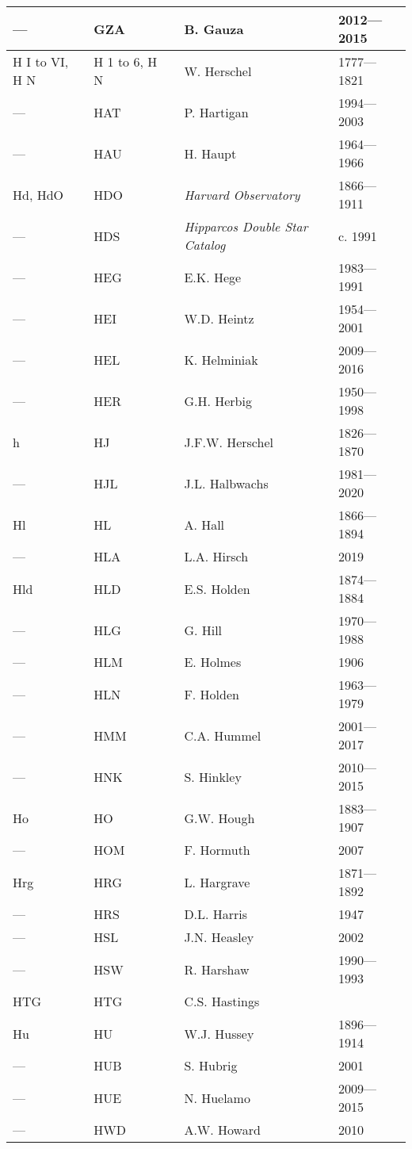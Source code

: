 \begin{longtable}{l|l|c|p{59mm}|l}
--- & GZA &   & B. Gauza & 2012---2015 \\\midrule
H I to VI, H N & H 1 to 6, H N &   & W. Herschel & 1777---1821 \\
--- & HAT &   & P. Hartigan & 1994---2003 \\
--- & HAU &   & H. Haupt & 1964---1966 \\
Hd, HdO & HDO &   & \emph{Harvard Observatory} & 1866---1911 \\
--- & HDS &   & \emph{Hipparcos Double Star Catalog} & c. 1991 \\
--- & HEG &   & E.K. Hege & 1983---1991 \\
--- & HEI &   & W.D. Heintz & 1954---2001 \\
--- & HEL &   & K. Helminiak & 2009---2016 \\
--- & HER &   & G.H. Herbig & 1950---1998 \\
h    & HJ  &   & J.F.W. Herschel & 1826---1870 \\
--- & HJL &   & J.L. Halbwachs & 1981---2020 \\
Hl  & HL  &   & A. Hall & 1866---1894 \\
--- & HLA &   & L.A. Hirsch & 2019 \\
Hld & HLD &   & E.S. Holden & 1874---1884 \\
--- & HLG &   & G. Hill & 1970---1988 \\
--- & HLM &   & E. Holmes & 1906 \\
--- & HLN &   & F. Holden & 1963---1979 \\
--- & HMM &   & C.A. Hummel & 2001---2017 \\
--- & HNK &   & S. Hinkley & 2010---2015 \\
Ho  & HO  &   & G.W. Hough & 1883---1907 \\
--- & HOM &   & F. Hormuth & 2007 \\
Hrg & HRG &   & L. Hargrave & 1871---1892 \\
--- & HRS &   & D.L. Harris & 1947 \\
--- & HSL &   & J.N. Heasley & 2002 \\
--- & HSW &   & R. Harshaw & 1990---1993 \\
HTG & HTG &   & C.S. Hastings & \\
Hu  & HU  &   & W.J. Hussey & 1896---1914 \\
--- & HUB &   & S. Hubrig & 2001 \\
--- & HUE &   & N. Huelamo & 2009---2015 \\
--- & HWD &   & A.W. Howard & 2010 \\

\end{longtable}
